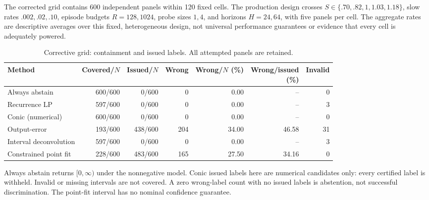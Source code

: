 The corrected grid contains 600 independent panels within 120 fixed cells. The production design crosses $S\in\{.70,.82,1,1.03,1.18\}$,
slow rates $.002,.02,.10$, episode budgets $R=128,1024$, probe sizes $1,4$,
and horizons $H=24,64$, with five panels per cell. The aggregate rates are
descriptive averages over this fixed, heterogeneous design, not universal
performance guarantees or evidence that every cell is adequately powered.

\begin{table}[htbp]\centering\small
\caption{Corrective grid: containment and issued labels. All attempted panels are retained.}
\label{tab:comparator_comparison}
\begin{tabular*}{\textwidth}{@{\extracolsep{\fill}}lrrrrrr@{}}
\toprule
Method & Covered/$N$ & Issued/$N$ & Wrong & \shortstack{Wrong/$N$\\(\%)} & \shortstack{Wrong/issued\\(\%)} & Invalid \\
\midrule
Always abstain & 600/600 & 0/600 & 0 & 0.00 & -- & 0 \\
Recurrence LP & 597/600 & 0/600 & 0 & 0.00 & -- & 3 \\
Conic (numerical) & 600/600 & 0/600 & 0 & 0.00 & -- & 0 \\
Output-error & 193/600 & 438/600 & 204 & 34.00 & 46.58 & 31 \\
Interval deconvolution & 597/600 & 0/600 & 0 & 0.00 & -- & 3 \\
Constrained point fit & 228/600 & 483/600 & 165 & 27.50 & 34.16 & 0 \\
\bottomrule\end{tabular*}
\par\smallskip\begin{minipage}{\textwidth}\footnotesize Always abstain returns $[0,\infty)$ under the nonnegative model. Conic issued labels here are numerical candidates only: every certified label is withheld. Invalid or missing intervals are not covered. A zero wrong-label count with no issued labels is abstention, not successful discrimination. The point-fit interval has no nominal confidence guarantee.\end{minipage}
\end{table}

